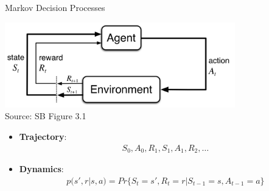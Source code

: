 \documentclass[ignorenonframetext,xcolor=x11names]{beamer}
\begin{document}
\begin{frame}{Markov Decision Processes}
\begin{center}
\includegraphics[width=0.75\textwidth]{screen3.png} \\

\scriptsize Source: SB Figure 3.1 \normalsize
\end{center}
\begin{itemize}
   \item \textbf{Trajectory}: 
\begin{align*}S_0, A_0, R_1, S_1, A_1, R_2, \ldots
\end{align*}
   \item \textbf{Dynamics}: 
\begin{align*}p(s', r | s, a) = Pr\{S_t = s', R_t =r | S_{t-1} = s, A_{t-1} = a \}
\end{align*}
\end{itemize}
\end{frame}

\end{document}
